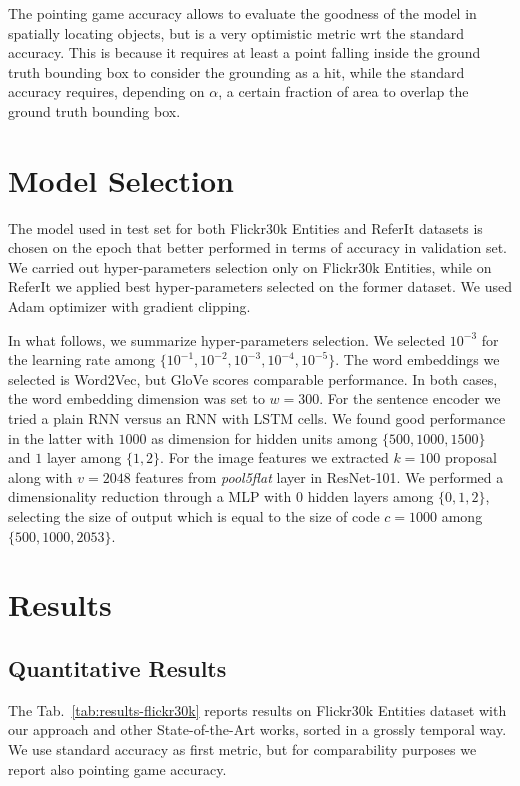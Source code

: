 The pointing game accuracy allows to evaluate the goodness of the
model in spatially locating objects, but is a very optimistic metric
wrt the standard accuracy. This is because it requires at least a
point falling inside the ground truth bounding box to consider the
grounding as a hit, while the standard accuracy requires, depending on
$\alpha$, a certain fraction of area to overlap the ground truth
bounding box.

\section{Model Selection}
\label{sec:model-selection}

The model used in test set for both Flickr30k Entities and ReferIt
datasets is chosen on the epoch that better performed in terms of
accuracy in validation set. We carried out hyper-parameters selection
only on Flickr30k Entities, while on ReferIt we applied best
hyper-parameters selected on the former dataset. We used Adam
optimizer with gradient clipping.

In what follows, we summarize hyper-parameters selection. We selected
$10^{-3}$ for the learning rate among $\{ 10^{-1}, 10^{-2}, 10^{-3},
10^{-4}, 10^{-5} \}$. The word embeddings we selected is Word2Vec, but
GloVe scores comparable performance. In both cases, the word embedding
dimension was set to $w = 300$. For the sentence encoder we tried a
plain RNN versus an RNN with LSTM cells. We found good performance in
the latter with $1000$ as dimension for hidden units among $\{ 500,
1000, 1500 \}$  and $1$ layer among $\{ 1, 2 \}$. For the image
features we extracted $k = 100$ proposal along with $v = 2048$
features from \textit{pool5\textunderscore flat} layer in ResNet-101.
We performed a dimensionality reduction through a MLP with $0$ hidden
layers among $\{ 0, 1, 2 \}$, selecting the size of output which is
equal to the size of code $c = 1000$ among $\{ 500, 1000, 2053 \}$.

\section{Results}
\label{sec:results}

\subsection{Quantitative Results}

The Tab.~\ref{tab:results-flickr30k} reports results on Flickr30k
Entities dataset with our approach and other State-of-the-Art works,
sorted in a grossly temporal way. We use standard accuracy as first
metric, but for comparability purposes we report also pointing game
accuracy.

